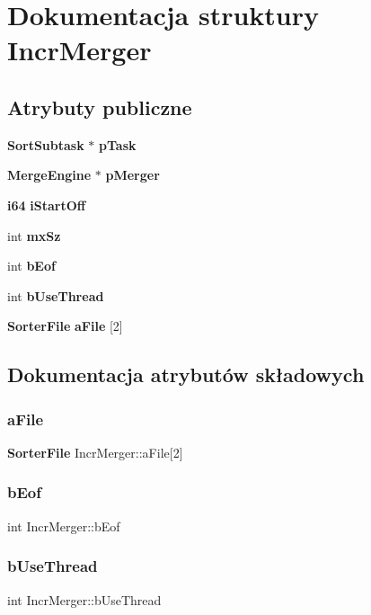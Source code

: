 \section{Dokumentacja struktury Incr\+Merger}
\label{struct_incr_merger}
\subsection*{Atrybuty publiczne}
\begin{DoxyCompactItemize}
\item 
\textbf{ Sort\+Subtask} $\ast$ \textbf{ p\+Task}
\item 
\textbf{ Merge\+Engine} $\ast$ \textbf{ p\+Merger}
\item 
\textbf{ i64} \textbf{ i\+Start\+Off}
\item 
int \textbf{ mx\+Sz}
\item 
int \textbf{ b\+Eof}
\item 
int \textbf{ b\+Use\+Thread}
\item 
\textbf{ Sorter\+File} \textbf{ a\+File} [2]
\end{DoxyCompactItemize}


\subsection{Dokumentacja atrybutów składowych}
\mbox{\label{struct_incr_merger_a276ff9bd9d3c7c9609cdfde70127bcc3}} 
\subsubsection{aFile}
{\footnotesize\ttfamily \textbf{ Sorter\+File} Incr\+Merger\+::a\+File[2]}

\mbox{\label{struct_incr_merger_af9ebc9bf53d72441086d98e379ca2721}} 
\subsubsection{bEof}
{\footnotesize\ttfamily int Incr\+Merger\+::b\+Eof}

\mbox{\label{struct_incr_merger_a5c4a9d27ce78f3edaa91c5d85c0f3474}} 
\subsubsection{bUseThread}
{\footnotesize\ttfamily int Incr\+Merger\+::b\+Use\+Thread}

